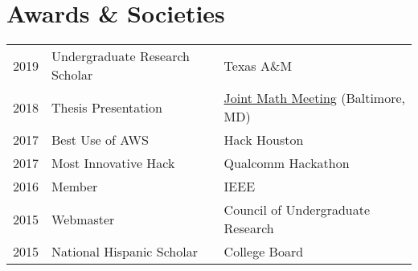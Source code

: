 \documentclass[letterpaper]{deedy-resume} %
\begin{document}
\begin{minipage}[t]{0.66\textwidth}


\section{Awards \& Societies} 

\begin{tabular}{rll}
	2019	 & Undergraduate Research Scholar & Texas A\&M \\
	2018	 & Thesis Presentation & \href{http://jointmathematicsmeetings.org}{Joint Math Meeting} (Baltimore, MD) \\
	2017	 & Best Use of AWS & Hack Houston \\
	2017	 & Most Innovative Hack & Qualcomm Hackathon\\
	2016	 & Member & IEEE\\
	2015	 & Webmaster & Council of Undergraduate Research \\
	2015	 & National Hispanic Scholar & College Board \\
\end{tabular}

\sectionspace %



\sectionspace %


\end{minipage} %
\end{document}
